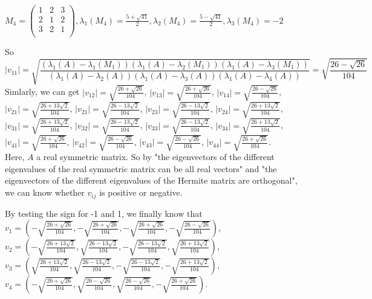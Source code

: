 \documentclass{amsart}
\theoremstyle{definition}
\theoremstyle{remark}
\numberwithin{equation}{section}
\begin{document}
$
M_{4}=\left( \begin{matrix}
	1&		2&		3\\
	2&		1&		2\\
	3&		2&		1\\
\end{matrix} \right) ,
\lambda _1\left( M_{4} \right) =\frac{5+\sqrt{41}}{2},\lambda _2\left( M_{4} \right) =\frac{5-\sqrt{41}}{2},\lambda _3\left( M_{4} \right) =-2
$

So
$$
\left| v_{11} \right|=\sqrt{\frac{\left( \lambda _1\left( A \right) -\lambda _1\left( M_1 \right) \right) \left( \lambda _1\left( A \right) -\lambda _2\left( M_1 \right) \right) \left( \lambda _1\left( A \right) -\lambda _3\left( M_1 \right) \right)}{\left( \lambda _1\left( A \right) -\lambda _2\left( A \right) \right) \left( \lambda _1\left( A \right) -\lambda _3\left( A \right) \right) \left( \lambda _1\left( A \right) -\lambda _4\left( A \right) \right)}}=\sqrt{\frac{26-\sqrt{26}}{104}}
$$
Simlarly, we can get
$\left| v_{12} \right|=\sqrt{\frac{26+\sqrt{26}}{104}}$, 
$\left| v_{13} \right|=\sqrt{\frac{26+\sqrt{26}}{104}}$, 
$\left| v_{14} \right|=\sqrt{\frac{26-\sqrt{26}}{104}}$, \\
$\left| v_{21} \right|=\sqrt{\frac{26+13\sqrt{2}}{104}}$, 
$\left| v_{21} \right|=\sqrt{\frac{26-13\sqrt{2}}{104}}$, 
$\left| v_{23} \right|=\sqrt{\frac{26-13\sqrt{2}}{104}}$,  
$\left| v_{24} \right|=\sqrt{\frac{26+13\sqrt{2}}{104}}$, \\
$\left| v_{31} \right|=\sqrt{\frac{26+13\sqrt{2}}{104}}$, 
$\left| v_{32} \right|=\sqrt{\frac{26-13\sqrt{2}}{104}}$, 
$\left| v_{33} \right|=\sqrt{\frac{26-13\sqrt{2}}{104}}$, 
$\left| v_{34} \right|=\sqrt{\frac{26+13\sqrt{2}}{104}}$,  \\
$\left| v_{41} \right|=\sqrt{\frac{26+\sqrt{26}}{104}}$, 
$\left| v_{42} \right|=\sqrt{\frac{26-\sqrt{26}}{104}}$, 
$\left| v_{43} \right|=\sqrt{\frac{26-\sqrt{26}}{104}}$, 
$\left| v_{44} \right|=\sqrt{\frac{26+\sqrt{26}}{104}}$.   \\

Here, $A$ a real symmetric matrix. So by "the eigenvectors of the different eigenvalues of the real symmetric matrix can be all real vectors" and "the eigenvectors of the different eigenvalues of the Hermite matrix are orthogonal", we can know whether $v_{ij}$ is positive or negative.

By testing the sign for -1 and 1, we finally know that \\
$v_{1}=\left( -\sqrt{\frac{26+\sqrt{26}}{104}},-\sqrt{\frac{26+\sqrt{26}}{104}},-\sqrt{\frac{26+\sqrt{26}}{104}}, -\sqrt{\frac{26-\sqrt{26}}{104}}\right)$, \\
$v_{2}=\left( -\sqrt{\frac{26+13\sqrt{2}}{104}},\sqrt{\frac{26-13\sqrt{2}}{104}},-\sqrt{\frac{26-13\sqrt{2}}{104}},\sqrt{\frac{26+13\sqrt{2}}{104}}\right)$, \\
$v_{3}=\left( \sqrt{\frac{26+13\sqrt{2}}{104}},\sqrt{\frac{26-13\sqrt{2}}{104}},-\sqrt{\frac{26-13\sqrt{2}}{104}},-\sqrt{\frac{26+13\sqrt{2}}{104}}\right)$,  \\
$v_{4}=\left( -\sqrt{\frac{26+\sqrt{26}}{104}},\sqrt{\frac{26-\sqrt{26}}{104}},\sqrt{\frac{26-\sqrt{26}}{104}},-\sqrt{\frac{26+\sqrt{26}}{104}}\right)$.   \\
\end{document}
